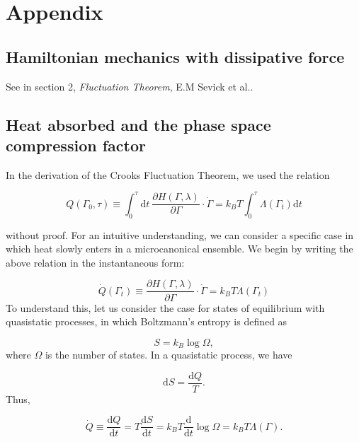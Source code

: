 \documentclass[ reprint, amsmath,amssymb, aps,]{revtex4-1}
\begin{document}
\section{Appendix}

\subsection{Hamiltonian mechanics with dissipative force}


See in section 2, \textit{Fluctuation Theorem}, E.M Sevick et al.\cite{Sevick2007}.


\subsection{Heat absorbed and the phase space compression factor}

In the derivation of the Crooks Fluctuation Theorem, we used the relation

\begin{equation}
  Q(\Gamma_0,\tau)\equiv\int_0^\tau\mathrm{d}t\  \frac{\partial H(\Gamma,\lambda)}{\partial{\Gamma}}\cdot\dot{\Gamma}=k_BT\int_0^\tau
\Lambda(\Gamma_t) \mathrm{d}t
\end{equation}

without proof. For an intuitive understanding, we can consider a specific case in which heat slowly enters in a microcanonical ensemble. We begin by writing the above relation in the instantaneous form:

\begin{equation}
\dot{Q}(\Gamma_t)\equiv\frac{\partial H(\Gamma,\lambda)}{\partial \Gamma}\cdot\dot\Gamma = k_BT\Lambda(\Gamma_t)
\end{equation}
To understand this, let us consider the case for states of equilibrium with quasistatic processes, in which Boltzmann's entropy is defined as 

\begin{equation}
S=k_B\log \Omega,
\end{equation}
where $\Omega$ is the number of states. In a quasistatic process, we have 

\begin{equation}
\mathrm{d}S=\frac{\mathrm{d}Q}{T}.
\end{equation}
Thus,

\begin{equation}
\dot{Q}\equiv\frac{\mathrm{d}Q}{\mathrm{d}t}=T\frac{\mathrm{d}S}{\mathrm{d}t}=k_BT\frac{\mathrm{d}}{\mathrm{d}t}\log{\Omega}=k_BT\Lambda(\Gamma).
\end{equation}

\nocite{*}
 


\end{document}
